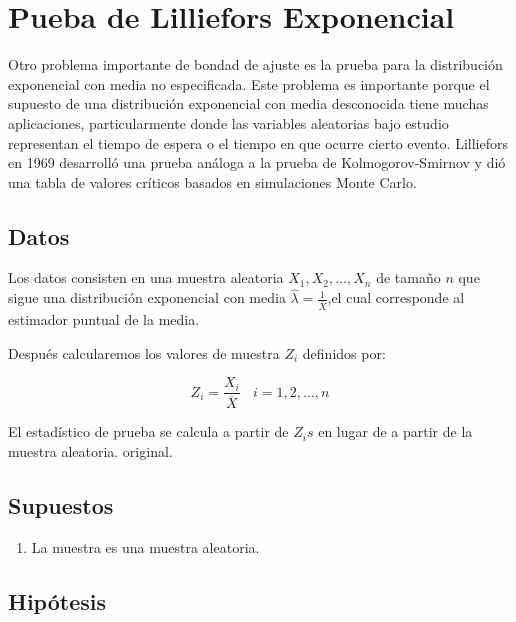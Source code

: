 \documentclass[
  a4paper,
  oneside,
  openany]{book}
\providecommand{\tightlist}{%
  \setlength{\itemsep}{0pt}\setlength{\parskip}{0pt}}
\begin{document}
\hypertarget{pueba-de-lilliefors-exponencial}{%
\chapter{Pueba de Lilliefors Exponencial}\label{pueba-de-lilliefors-exponencial}}

Otro problema importante de bondad de ajuste es la prueba para la distribución exponencial con media no especificada. Este problema es importante porque el supuesto de una distribución exponencial con media desconocida tiene muchas aplicaciones, particularmente donde las variables aleatorias bajo estudio representan el tiempo de espera o el tiempo en que ocurre cierto evento.
Lilliefors en 1969 desarrolló una prueba análoga a la prueba de Kolmogorov-Smirnov y dió una tabla de valores críticos basados en simulaciones Monte Carlo.

\hypertarget{datos-17}{%
\section{Datos}\label{datos-17}}

Los datos consisten en una muestra aleatoria \(X_{1},X_{2},\ldots,X_{n}\) de tamaño \(n\) que sigue una distribución exponencial con media \(\hat{\lambda} = \frac{1}{\overline{X}}\),el cual corresponde al estimador puntual de la media.

Después calcularemos los valores de muestra \(Z_{i}\) definidos por:

\[Z_{i}=\frac{X_{i}}{\overline{X}} \ \ \ \ i=1,2,\ldots,n\]

El estadístico de prueba se calcula a partir de \(Z_{i}s\) en lugar de a partir de la muestra aleatoria. original.

\hypertarget{supuestos-15}{%
\section{Supuestos}\label{supuestos-15}}

\begin{enumerate}
\def\labelenumi{\arabic{enumi})}
\tightlist
\item
  La muestra es una muestra aleatoria.
\end{enumerate}

\hypertarget{hipuxf3tesis-17}{%
\section{Hipótesis}\label{hipuxf3tesis-17}}
\end{document}
